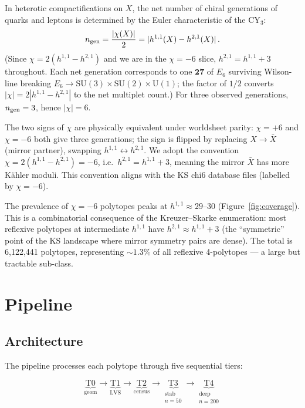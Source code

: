 \documentclass[11pt,a4paper]{article}
\begin{document}
In heterotic compactifications on $X$, the net number of
chiral generations of quarks and leptons is determined by the
Euler characteristic of the CY$_3$:
\begin{equation}
  n_{\rm gen} = \frac{|\chi(X)|}{2}
    = |h^{1,1}(X) - h^{2,1}(X)|\,.
  \label{eq:ngen_sec}
\end{equation}
(Since $\chi=2(h^{1,1}-h^{2,1})$ and we are in the $\chi=-6$ slice,
$h^{2,1}=h^{1,1}+3$ throughout.
Each net generation corresponds to one $\mathbf{27}$ of $E_6$
surviving Wilson-line breaking
$E_6 \to \mathrm{SU}(3)\times\mathrm{SU}(2)\times\mathrm{U}(1)$;
the factor of $1/2$ converts $|\chi|=2|h^{1,1}-h^{2,1}|$
to the net multiplet count.)
For three observed generations, $n_{\rm gen}=3$, hence
$|\chi| = 6$.

The two signs of $\chi$ are physically equivalent under
worldsheet parity: $\chi = +6$ and $\chi = -6$ both give three
generations; the sign is flipped by replacing $X\to \bar X$
(mirror partner), swapping $h^{1,1}\leftrightarrow h^{2,1}$.
We adopt the convention $\chi = 2(h^{1,1}-h^{2,1}) = -6$,
i.e.\ $h^{2,1} = h^{1,1}+3$, meaning the mirror $\bar X$
has more K\"{a}hler moduli.
This convention aligns with the KS chi6 database files
(labelled by $\chi=-6$).

The prevalence of $\chi=-6$ polytopes peaks at $h^{1,1} \approx 29$--30
(Figure~\ref{fig:coverage}).
This is a combinatorial consequence of the Kreuzer--Skarke
enumeration: most reflexive polytopes at intermediate $h^{1,1}$
have $h^{2,1}\approx h^{1,1}+3$ (the ``symmetric'' point
of the KS landscape where mirror symmetry pairs are dense).
The total is 6,122,441 polytopes, representing $\sim 1.3\%$ of
all reflexive 4-polytopes --- a large but tractable sub-class.

\section{Pipeline}
\label{sec:pipeline}

\subsection{Architecture}

The pipeline processes each polytope through five sequential tiers:

\[
  \underbrace{\text{T0}}_{\text{geom}} \to
  \underbrace{\text{T1}}_{\text{LVS}} \to
  \underbrace{\text{T2}}_{\text{census}} \to
  \underbrace{\text{T3}}_{\substack{\text{stab}\\ n=50}} \to
  \underbrace{\text{T4}}_{\substack{\text{deep}\\ n=200}}
\]
\end{document}
